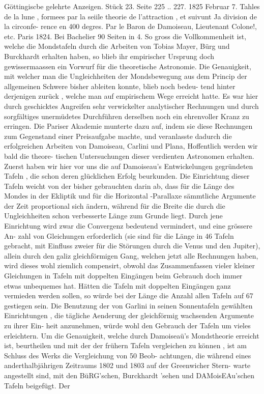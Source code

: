 \documentclass[12pt,a4paper]{article}
\begin{document}
{{{{{{{{Göttingiscbe  gelehrte  Anzeigen.     Stück  23.     Seite  225 ..  227.     1825  Februar  7. Tahles  de  la  lune ,  formees  par  la  seiile  theorie  de  l'attraction ,  et  suivunt  Ja  division  de  la  circonfe- rence  en  400  degres.  Par  le  Baron  de  Damoiseau,  Lieutenant  Colone!,  etc.  Paris  1824.  Bei  Bachelier 90  Seiten  in  4. So  gross  die  Vollkommenheit  ist,  welche  die  Mondstafeln  durch  die  Arbeiten  von  Tobias  Mayer, Bürg  und  Burckhardt  erhalten  haben,  so  blieb  ihr  empirischer  Ursprung  doch  gewissermaassen  ein Vorwurf  für  die  theoretische  Astronomie.  Die  Genauigkeit,  mit  welcher  man  die  Ungleichheiten  der Mondsbewegung  aus  dem  Princip  der  allgemeinen  Schwere  bisher  ableiten  konnte,  blieb  noch  bedeu- tend hinter  derjenigen  zurück ,  welche  man  auf  empirischem  Wege  erreicht  hatte.  Es  war  hier  durch geschicktes  Angreifen  sehr  verwickelter  analytischer  Rechnungen  und  durch  sorgfältiges  unermüdetes Durchführen  derselben  noch  ein  ehrenvoller  Kranz  zu  erringen.  Die  Pariser  Akademie  munterte  dazu auf,  indem  sie  diese  Rechnungen  zum  Gegenstand  einer  Preisaufgabe  machte,  und  veranlasste  dadurch die  erfolgreichen  Arbeiten  von  Damoiseau,  Carlini  und  Plana,  Hoffentlich  werden  wir  bald  die  theore- tischen Untersuchungen  dieser  verdienten  Astronomen  erhalten.  Zuerst  haben  wir  hier  vor  uns  die  auf Damoiseau's  Entwickelungen  gegründeten  Tafeln ,  die  schon  deren  glücklichen  Erfolg  beurkunden. Die  Einrichtung  dieser  Tafeln  weicht  von  der  bisher  gebrauchten  darin  ab,  dass  für  die  Länge  des Mondes  in  der  Ekliptik  und  für  die  Horizontal -Parallaxe  sämmtliche  Argumente  der  Zeit  proportional sich  ändern,  während  für  die  Breite  die  durch  die  Ungleichheiten  schon  verbesserte  Länge  zum  Grunde liegt.  Durch  jene  Einrichtung  wird  zwar  die  Convergenz  bedeutend  vermindert,  und  eine  grössere  An- zahl von  Gleichungen  erforderlich  (sie  sind  für  die  Länge  in  46  Tafeln  gebracht,  mit  Einfluss  zweier  für die  Störungen  durch  die  Venus  und  den  Jupiter),  allein  durch  den  galiz  gleichförmigen  Gang,  welchen jetzt  alle  Rechnungen  haben,  wird  dieses  wohl  ziemlich  compensirt,  obwohl  das  Zusammenfassen  vieler kleiner  Gleichungen  in  Tafeln  mit  doppelten  Eingängen  beim  Gebrauch  doch  immer  etwas  unbequemes hat.  Hätten  die  Tafeln  mit  doppelten  Eingängen  ganz  vermieden  werden  sollen,  so  würde  bei  der  Länge die  Anzahl  allen  Tafeln  auf  67  gestiegen  sein.  Die  Benutzung  der  von  Garlini  in  seinen  Sonnentafeln gewählten  Einrichtungen ,  die  tägliche  Aenderung  der  gleichförmig  wachsenden  Argumente  zu  ihrer  Ein- heit anzunehmen,  würde  wohl  den  Gebrauch  der  Tafeln  um  vieles  erleichtern. Um  die  Genauigkeit,  welche  durch  Damoiseaü's  Mondstheorie  erreicht  ist,  beurtheilen  und  mit der  der  frühern  Tafeln  vergleichen  zu  können ,  ist  am  Schluss  des  Werks  die  Vergleichung  von  50  Beob- achtungen, die  während  eines  anderthalbjährigen  Zeitraums  1802  und  1803  auf  der  Greenwicher  Stern- warte angestellt  sind,  mit  den  BüRG'schen,  Burckhardt 'sehen  und  DAMoisEAu'schen  Tafeln  beigefügt. Der  }}}}}}}}
\end{document}
